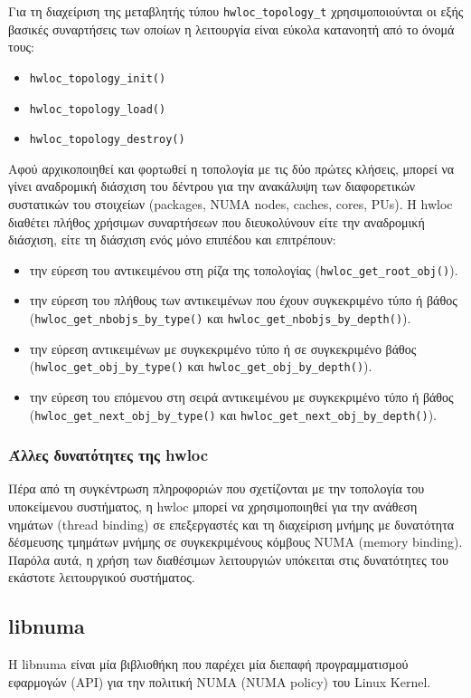 Για τη διαχείριση της μεταβλητής τύπου \texttt{hwloc\_topology\_t} χρησιμοποιούνται οι εξής βασικές συναρτήσεις των οποίων η λειτουργία είναι εύκολα κατανοητή από το όνομά τους:
\begin{itemize}
	\item \texttt{hwloc\_topology\_init()}
	\item \texttt{hwloc\_topology\_load()}
	\item \texttt{hwloc\_topology\_destroy()}
\end{itemize}

Αφού αρχικοποιηθεί και φορτωθεί η τοπολογία με τις δύο πρώτες κλήσεις, μπορεί να γίνει αναδρομική διάσχιση του δέντρου για την ανακάλυψη των διαφορετικών συστατικών του στοιχείων (packages, NUMA nodes, caches, cores, PUs). Η hwloc διαθέτει πλήθος χρήσιμων συναρτήσεων που διευκολύνουν είτε την αναδρομική διάσχιση, είτε τη διάσχιση ενός μόνο επιπέδου και επιτρέπουν:
\begin{itemize}
	\item την εύρεση του αντικειμένου στη ρίζα της τοπολογίας (\texttt{hwloc\_get\_root\_obj()}).
	\item την εύρεση του πλήθους των αντικειμένων που έχουν συγκεκριμένο τύπο ή βάθος (\texttt{hwloc\_get\_nbobjs\_by\_type()} και \texttt{hwloc\_get\_nbobjs\_by\_depth()}).
	\item την εύρεση αντικειμένων με συγκεκριμένο τύπο ή σε συγκεκριμένο βάθος (\texttt{hwloc\_get\_obj\_by\_type()} και \texttt{hwloc\_get\_obj\_by\_depth()}).
	\item την εύρεση του επόμενου στη σειρά αντικειμένου με συγκεκριμένο τύπο ή βάθος (\texttt{hwloc\_get\_next\_obj\_by\_type()} και \texttt{hwloc\_get\_next\_obj\_by\_depth()}).
\end{itemize}


\subsubsection{Άλλες δυνατότητες της hwloc}
Πέρα από τη συγκέντρωση πληροφοριών που σχετίζονται με την τοπολογία του υποκείμενου συστήματος, η hwloc μπορεί να χρησιμοποιηθεί για την ανάθεση νημάτων (thread binding) σε επεξεργαστές και τη διαχείριση μνήμης με δυνατότητα δέσμευσης τμημάτων μνήμης σε συγκεκριμένους κόμβους NUMA (memory binding). Παρόλα αυτά, η χρήση των διαθέσιμων λειτουργιών υπόκειται στις δυνατότητες του εκάστοτε λειτουργικού συστήματος.


\subsection{libnuma}
Η libnuma είναι μία βιβλιοθήκη που παρέχει μία διεπαφή προγραμματισμού εφαρμογών (API) για την πολιτική NUMA (NUMA policy) του Linux Kernel.

